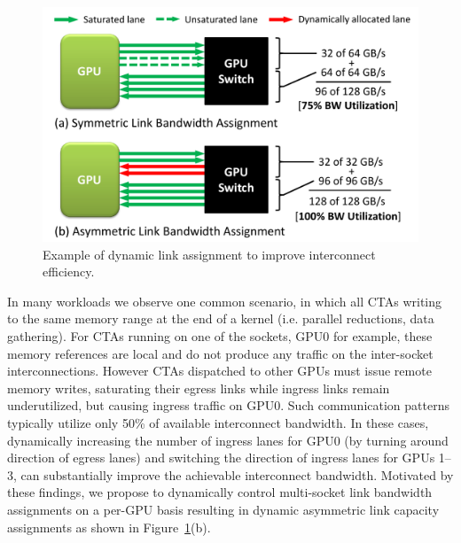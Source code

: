 \begin{figure}[t]
    \centering
    \includegraphics[width=1.0\columnwidth]{figures/link_assignment.pdf}
    \caption{Example of dynamic link assignment to improve interconnect efficiency.}
    \label{fig:symmetric_assymetric}
    \vspace{-.2in}
\end{figure}

In many workloads we observe one common
scenario, in which all CTAs writing to the same memory range at the end of a
kernel (i.e. parallel reductions, data gathering). For CTAs running on one of the
sockets, GPU0 for example, these memory references are local and do not
produce any traffic on the inter-socket interconnections. However CTAs dispatched
to other GPUs must issue remote memory writes, saturating their egress links while
ingress links remain underutilized, but causing ingress traffic on GPU0. 
Such communication patterns typically utilize only
50\% of available interconnect bandwidth. In these cases, dynamically increasing the 
number of ingress lanes for GPU0
(by turning around direction of egress lanes) and switching the direction of
ingress lanes for GPUs 1--3, can substantially improve the achievable interconnect
bandwidth. Motivated by these findings, we propose to dynamically control multi-socket
link bandwidth assignments on a per-GPU basis resulting in
dynamic asymmetric link capacity assignments as shown in
Figure~\ref{fig:symmetric_assymetric}(b).  

